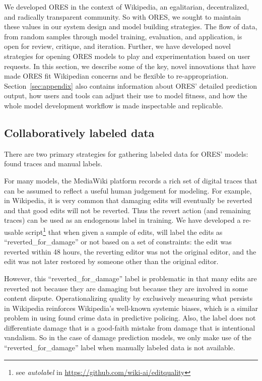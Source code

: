 We developed ORES in the context of Wikipedia, an egalitarian, decentralized, and radically transparent community.  So with ORES, we sought to maintain these values in our system design and model building strategies.  The flow of data, from random samples through model training, evaluation, and application, is open for review, critique, and iteration.  Further, we have developed novel strategies for opening ORES models to play and experimentation based on user requests.  In this section, we describe some of the key, novel innovations that have made ORES fit Wikipedian concerns and be flexible to re-appropriation.  Section~\ref{sec:appendix} also contains information about ORES' detailed prediction output, how users and tools can adjust their use to model fitness, and how the whole model development workflow is made inspectable and replicable.

\subsection{Collaboratively labeled data}
There are two primary strategies for gathering labeled data for ORES' models: found traces and manual labels.

 For many models, the MediaWiki platform records a rich set of digital traces that can be assumed to reflect a useful human judgement for modeling.  For example, in Wikipedia, it is very common that damaging edits will eventually be reverted and that good edits will not be reverted.  Thus the revert action (and remaining traces) can be used as an endogenous label in training.  We have developed a re-usable script\footnote{see \emph{autolabel} in \url{https://github.com/wiki-ai/editquality}} that when given a sample of edits, will label the edits as ``reverted\_for\_damage'' or not based on a set of constraints: the edit was reverted within 48 hours, the reverting editor was not the original editor, and the edit was not later restored by someone other than the original editor.

However, this ``reverted\_for\_damage'' label is problematic in that many edits are reverted not because they are damaging but because they are involved in some content dispute.  Operationalizing quality by exclusively measuring what persists in Wikipedia reinforces Wikipedia's well-known systemic biases, which is a similar problem in using found crime data in predictive policing.  Also, the label does not differentiate damage that is a good-faith mistake from damage that is intentional vandalism.  So in the case of damage prediction models, we only make use of the ``reverted\_for\_damage'' label when manually labeled data is not available.

